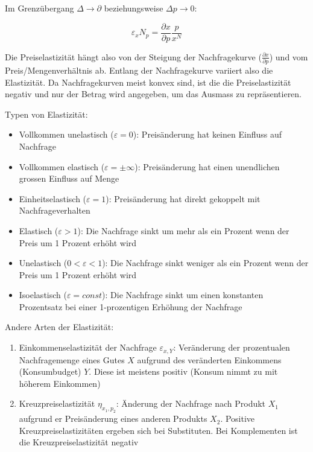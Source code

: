 \documentclass[8pt, landscape, fleqn]{scrartcl}
\begin{document}
\begin{multicols*}{3}
Im Grenzübergang $\Delta \rightarrow \partial$ beziehungsweise $\Delta p \rightarrow 0$:

\begin{equation}
    \varepsilon_x N_p = \frac{\partial x}{\partial p}\frac{p}{x^N}
\end{equation}

Die Preiselastizität hängt also von der Steigung der Nachfragekurve ($\frac{\partial x}{\partial p}$) und vom Preis/Mengenverhältnis ab. Entlang der Nachfragekurve variiert also die Elastizität. Da Nachfragekurven meist konvex sind, ist die die Preiselastizität negativ und nur der Betrag wird angegeben,
um das Ausmass zu repräsentieren. \newline \newline

Typen von Elastizität: 
    \begin{itemize}
        \item Vollkommen unelastisch ($\varepsilon = 0$): Preisänderung hat keinen Einfluss auf Nachfrage 
        \item Vollkommen elastisch ($\varepsilon = \pm \infty$): Preisänderung hat einen unendlichen grossen Einfluss auf Menge 
        \item Einheitselastisch ($\varepsilon = 1$): Preisänderung hat direkt gekoppelt mit Nachfrageverhalten 
        \item Elastisch ($\varepsilon > 1$): Die Nachfrage sinkt um mehr als ein Prozent wenn der Preis um 1 Prozent erhöht wird
        \item Unelastisch ($0<\varepsilon<1$): Die Nachfrage sinkt weniger als ein Prozent wenn der Preis um 1 Prozent erhöht wird
        \item Isoelastisch ($\varepsilon = const$): Die Nachfrage sinkt um einen konstanten Prozentsatz bei einer 1-prozentigen Erhöhung der Nachfrage
    \end{itemize}

Andere Arten der Elastizität: 

    \begin{enumerate}
        \item Einkommenselastizität der Nachfrage $\varepsilon_{x,Y}$: Veränderung der prozentualen Nachfragemenge eines Gutes $X$ aufgrund des veränderten Einkommens (Konsumbudget) $Y$. Diese ist meistens positiv (Konsum nimmt zu mit höherem Einkommen)
        \item Kreuzpreiselastizität $\eta_{x_1,p_2}$: Änderung der Nachfrage nach Produkt $X_1$ aufgrund er Preisänderung eines anderen Produkts $X_2$. Positive Kreuzpreiselastizitäten ergeben sich bei Substituten. Bei Komplementen ist die Kreuzpreiselastizität negativ 
    \end{enumerate}


\end{multicols*}
\end{document}
